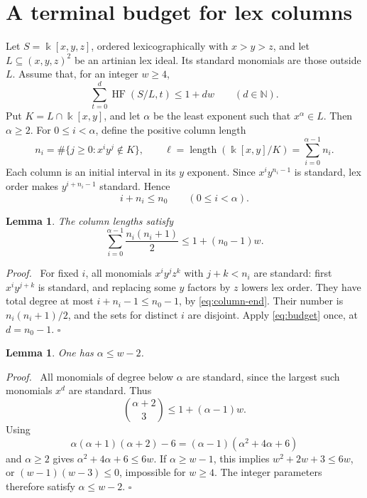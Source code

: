 \documentclass[11pt,a4paper]{article}
\newtheorem{lemma}[theorem]{Lemma}
\newenvironment{proof}[1][Proof]{\par\noindent\textit{#1.}\ \ignorespaces}{\unskip\nobreak\hfill\ensuremath{\square}\par}
\newcommand{\NN}{\mathbb N}
\newcommand{\kk}{\Bbbk}
\newcommand{\HF}{\operatorname{HF}}
\newcommand{\len}{\operatorname{length}}
\begin{document}
\section{A terminal budget for lex columns}
Let $S=\kk[x,y,z]$, ordered lexicographically with $x>y>z$, and let $L\subseteq(x,y,z)^2$ be an artinian lex ideal. Its standard monomials are those outside $L$. Assume that, for an integer $w\ge4$,
\begin{equation}\label{eq:budget}
 \sum_{t=0}^{d}\HF(S/L,t)\le1+dw\qquad(d\in\NN).
\end{equation}
Put $K=L\cap\kk[x,y]$, and let $\alpha$ be the least exponent such that $x^\alpha\in L$. Then $\alpha\ge2$. For $0\le i<\alpha$, define the positive column length
\[
 n_i=\#\{j\ge0:x^iy^j\notin K\},\qquad
 \ell=\len(\kk[x,y]/K)=\sum_{i=0}^{\alpha-1}n_i.
\]
Each column is an initial interval in its $y$ exponent. Since $x^iy^{n_i-1}$ is standard, lex order makes $y^{i+n_i-1}$ standard. Hence
\begin{equation}\label{eq:column-end}
 i+n_i\le n_0\qquad(0\le i<\alpha).
\end{equation}

\begin{lemma}\label{lem:terminal}
The column lengths satisfy
\begin{equation}\label{eq:terminal}
 \sum_{i=0}^{\alpha-1}\frac{n_i(n_i+1)}2\le1+(n_0-1)w.
\end{equation}
\end{lemma}
\begin{proof}
For fixed $i$, all monomials $x^iy^jz^k$ with $j+k<n_i$ are standard: first $x^iy^{j+k}$ is standard, and replacing some $y$ factors by $z$ lowers lex order. They have total degree at most $i+n_i-1\le n_0-1$, by \eqref{eq:column-end}. Their number is $n_i(n_i+1)/2$, and the sets for distinct $i$ are disjoint. Apply \eqref{eq:budget} once, at $d=n_0-1$.
\end{proof}

\begin{lemma}\label{lem:alpha}
One has $\alpha\le w-2$.
\end{lemma}
\begin{proof}
All monomials of degree below $\alpha$ are standard, since the largest such monomials $x^d$ are standard. Thus
\[
 \binom{\alpha+2}{3}\le1+(\alpha-1)w.
\]
Using
\[
 \alpha(\alpha+1)(\alpha+2)-6
   =(\alpha-1)(\alpha^2+4\alpha+6)
\]
and $\alpha\ge2$ gives $\alpha^2+4\alpha+6\le6w$. If $\alpha\ge w-1$, this implies $w^2+2w+3\le6w$, or $(w-1)(w-3)\le0$, impossible for $w\ge4$. The integer parameters therefore satisfy $\alpha\le w-2$.
\end{proof}
\end{document}
